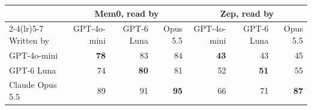 \begin{tabular}{lrrrrrr}
\toprule
 & \multicolumn{3}{c}{Mem0, read by} & \multicolumn{3}{c}{Zep, read by} \\
\cmidrule(lr){2-4}\cmidrule(lr){5-7}
Written by & GPT-4o-mini & GPT-6 Luna & Opus 5.5 & GPT-4o-mini & GPT-6 Luna & Opus 5.5 \\
\midrule
GPT-4o-mini & \textbf{78} & 83 & 84 & \textbf{43} & 43 & 45 \\
GPT-6 Luna & 74 & \textbf{80} & 81 & 52 & \textbf{51} & 55 \\
Claude Opus 5.5 & 89 & 91 & \textbf{95} & 66 & 71 & \textbf{87} \\
\bottomrule
\end{tabular}
